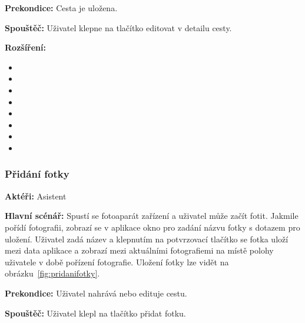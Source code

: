 \documentclass{article}
\newcommand{\usecase}[2]{\subsubsection{#1}\label{#2}}
\begin{document}
\vspace{0.1cm}
\noindent
\textbf{Prekondice:} Cesta je uložena.

\vspace{0.1cm}
\noindent
\textbf{Spouštěč:} Uživatel klepne na tlačítko editovat v detailu cesty.

\vspace{0.1cm}
\noindent
\textbf{Rozšíření:}
\begin{itemize}
  \item {}
  \item {}
  \item {}
  \item {}
    \item {}
    \item {}
    \item {}
    \item {}
\end{itemize}

\usecase{Přidání fotky}{pridanifotky}
\textbf{Aktéři:} Asistent

\vspace{0.1cm}
\noindent
\textbf{Hlavní scénář:} Spustí se fotoaparát zařízení a uživatel může začít fotit. Jakmile pořídí
fotografii, zobrazí se v aplikace okno pro zadání názvu fotky s dotazem pro uložení. Uživatel zadá název
a klepnutím na potvrzovací tlačítko se fotka uloží mezi data aplikace a zobrazí mezi aktuálními fotografiemi
na místě polohy uživatele v době pořízení fotografie. Uložení fotky lze vidět na obrázku~\ref{fig:pridanifotky}.

\vspace{0.1cm}
\noindent
\textbf{Prekondice:} Uživatel nahrává nebo edituje cestu.

\vspace{0.1cm}
\noindent
\textbf{Spouštěč:} Uživatel klepl na tlačítko přidat fotku.
\end{document}
